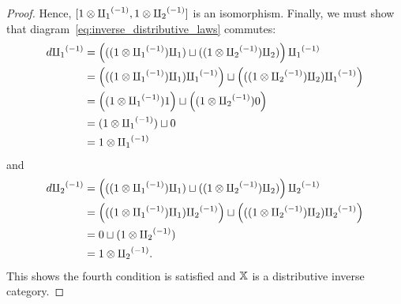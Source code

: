 \begin{proof}
  Hence, $[1\* \icpa, 1\* \icpb]$ is an isomorphism.
  Finally, we must show that diagram~\ref{eq:inverse_distributive_laws} commutes:
  \begin{align*}
    d \icpa & = \left( ((1 \* \icpa) \cpa )\djoin ((1\*\icpb) \cpb) \right)\icpa \\
     & = \left(((1 \* \icpa) \cpa )\icpa \right) \djoin \left( ((1\*\icpb) \cpb) \icpa\right) \\
     & = \left((1 \* \icpa) 1 \right) \djoin \left( (1\*\icpb) 0\right) \\
     & = (1 \* \icpa) \djoin 0\\
     & = 1 \* \icpa
  \end{align*}
  and
  \begin{align*}
    d \icpb & = \left( ((1 \* \icpa) \cpa )\djoin ((1\*\icpb) \cpb) \right)\icpb \\
     & = \left(((1 \* \icpa) \cpa )\icpb \right) \djoin \left( ((1\*\icpb) \cpb) \icpb\right) \\
     & = 0 \djoin (1 \* \icpb)\\
     & = 1 \* \icpb.
  \end{align*}
  This shows the fourth condition is satisfied and $\X$ is a distributive inverse category.
\end{proof}

